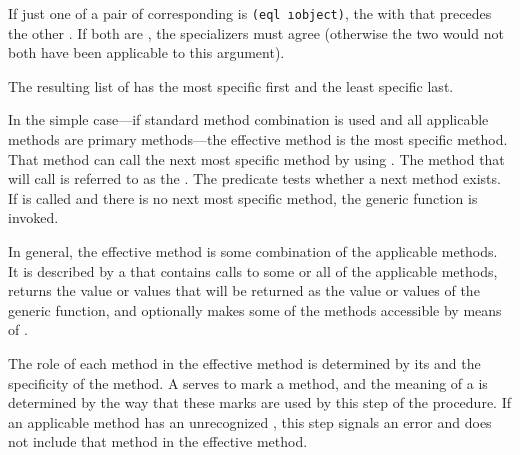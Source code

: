 If just one of a pair of corresponding  is {\tt (eql \i{object})},
the  with that  precedes the
other .  If both  are 
, the
specializers must agree (otherwise the two  would
not both have been applicable to this argument).

The resulting list of  has the most specific
 first and the least specific  last.    

\endsubsubsubsection%


In the simple case---if standard method combination is used and all
applicable methods are primary methods---the 
effective method is the most specific method.
That method can call the next most specific
method by using .  The method that
 will call is referred to as the 
.  The predicate  tests whether a next
method exists.  If  is called and there is no
next most specific method, the generic function 
is invoked.

In general, the effective method is some combination of the applicable
methods.  It is described by a  that contains calls to some or
all of the applicable methods, returns the value or values that will
be returned as the value or values of the generic function, and
optionally makes some of the methods accessible by means of 
.

The role of each method in the effective method is determined by its
 and the specificity of the method.  A 
serves to mark a method, and the meaning of a  is
determined by the way that these marks are used by this step
of the procedure.  If an applicable method has an unrecognized
, this step signals an error and does not include that method
in the effective method.

